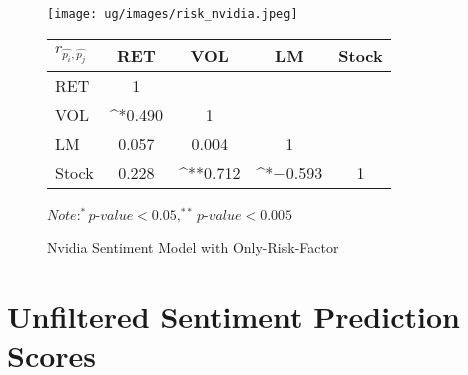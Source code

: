 \documentclass[logo,bsc,singlespacing,parskip]{infthesis}
\begin{document}
\begin{figure}[p]
\centering
\begin{minipage}{0.90\textwidth}
    \centering
    \texttt{[image: ug/images/risk\_nvidia.jpeg]}
    \caption{Nvidia Sentiment Model with Only-Risk-Factor}
    \label{fig:risk_nvidia}
\end{minipage}%
\hfill
\vspace{30pt} %
\begin{minipage}{0.9\textwidth}

    \begin{minipage}[p]{0.9\textwidth}
    \centering
    \begin{tabular}{lcccc}
    \label{tab:risk_nvidia_corr}
    $r_{\hat{p_i}, \hat{p_j}}$      & RET       & VOL       & LM        & Stock    \\ \hline
    RET    & 1  &   &  &  \\
    VOL    & ^{*}0.490   & 1  &  &   \\
    LM    & 0.057 & 0.004 & 1  &  \\
    Stock  & 0.228 & ^{**}0.712  & ^{*}$-$0.593 & 1  \\ \hline
    \end{tabular}
    \medskip
    $\textit{Note}: ^{*}p$-$value<0.05, ^{**}p$-$value<0.005$
    \end{minipage}

\end{minipage}
\end{figure}



\chapter{Unfiltered Sentiment Prediction Scores}
\end{document}
